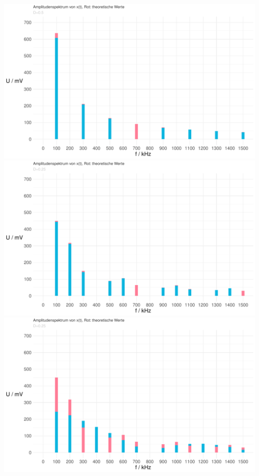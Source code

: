 \documentclass[a4paper, 12pt]{article}
\begin{document}
    \begin{center}
      \includegraphics[scale=0.5]{./R/3_1/3_1_ASpektrum.pdf}
      \vspace{0.021276873\paperheight}
      \vspace{0.021276873\paperheight}
      \includegraphics[scale=0.5]{./R/3_1/3_1_ASpektrum_025.pdf}
      \vspace{0.021276873\paperheight}
      \vspace{0.021276873\paperheight}
      \includegraphics[scale=0.5]{./R/3_1/3_1_ASpektrum_0125.pdf}
    \end{center}


  \subsection{}

  \subsection{}
\end{document}

